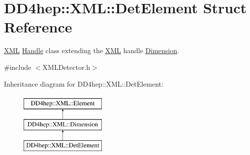 \hypertarget{struct_d_d4hep_1_1_x_m_l_1_1_det_element}{}\section{D\+D4hep\+:\+:X\+ML\+:\+:Det\+Element Struct Reference}
\label{struct_d_d4hep_1_1_x_m_l_1_1_det_element}


\hyperlink{namespace_d_d4hep_1_1_x_m_l}{X\+ML} \hyperlink{class_d_d4hep_1_1_handle}{Handle} class extending the \hyperlink{namespace_d_d4hep_1_1_x_m_l}{X\+ML} handle \hyperlink{struct_d_d4hep_1_1_x_m_l_1_1_dimension}{Dimension}.  




{\ttfamily \#include $<$X\+M\+L\+Detector.\+h$>$}

Inheritance diagram for D\+D4hep\+:\+:X\+ML\+:\+:Det\+Element\+:\begin{figure}[H]
\begin{center}
\leavevmode
\includegraphics[height=3.000000cm]{struct_d_d4hep_1_1_x_m_l_1_1_det_element}
\end{center}
\end{figure}
